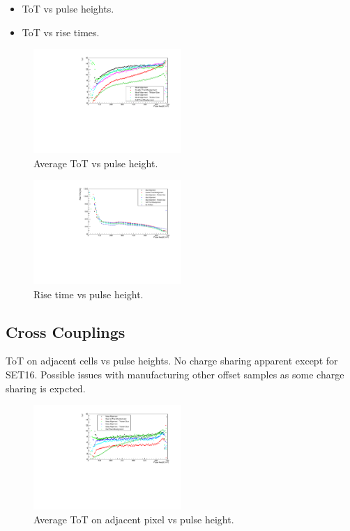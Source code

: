 \begin{itemize}
\item ToT vs pulse heights.  
\item ToT vs rise times.  
\end{itemize}

\begin{figure}
\centering
\includegraphics[width=0.5\textwidth]{CLICdpVertex/Plots/TargetToT_vs_PulseHeight.pdf}
\caption[Average ToT vs pulse height.]{Average ToT vs pulse height.}
\label{fig:avgtotvspulseheight}
\end{figure}

\begin{figure}
\centering
\includegraphics[width=0.5\textwidth]{CLICdpVertex/Plots/RiseTime_vs_PulseHeight.pdf}
\caption[Rise time vs pulse height.]{Rise time vs pulse height.}
\label{fig:risetimevspulseheight}
\end{figure}

\subsection{Cross Couplings}
ToT on adjacent cells vs pulse heights.  No charge sharing apparent except for SET16.  Possible issues with manufacturing other offset samples as some charge sharing is expcted.

\begin{figure}
\centering
\includegraphics[width=0.5\textwidth]{CLICdpVertex/Plots/ToT_X_vs_PulseHeight.pdf}
\caption[Average ToT on adjacent pixel vs pulse height.]{Average ToT on adjacent pixel vs pulse height.}
\label{fig:avgtotadjvspulseheight}
\end{figure}

